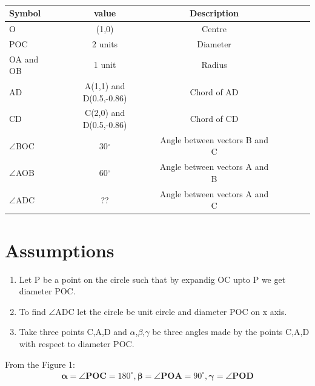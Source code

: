 \documentclass[12pt]{article}
\let\vec\mathbf
\begin{document}
\begin{table}[htbp]
 \begin{center}
    \begin{tabular}{|l|c|c|c|c|c|c} \hline \textbf{Symbol}
  & \textbf{value} & \textbf{Description} \\
 \hline
	    O &(1,0) & Centre \\ \hline
POC &2 units& Diameter\\ \hline
	 OA and OB &1 unit& Radius\\ \hline
 AD  &A(1,1) and D(0.5,-0.86) & Chord of AD \\ \hline
CD  &C(2,0) and D(0.5,-0.86) & Chord of CD \\ \hline
$\angle$BOC &30$^\circ$ & Angle between vectors B and C  \\ \hline
$\angle$AOB&60$^\circ$&Angle between vectors A and B\\
	\hline
	$\angle$ADC&??&Angle between vectors A and C \\
	\hline
\end{tabular}   
\end{center}
\caption{\label{table:dummytable} }
\end{table}

\section*{\large Assumptions}
\begin{enumerate}
\item Let P be a point on the circle such that by expandig OC upto P we get diameter POC.
\item To find $\angle$ADC let the circle be unit circle and diameter POC on x axis.
\item Take three points C,A,D  and $\alpha$,$\beta$,$\gamma$ be three angles made by the points C,A,D with respect to diameter POC.
\end{enumerate}
From the Figure 1:
\begin{align}
\vec{\alpha} = \vec{\angle POC}= 180^\circ, 
\vec{\beta} = \vec{\angle POA} = 90^\circ,
\vec{\gamma} = \vec{\angle POD}
\end{align}
\end{document}
